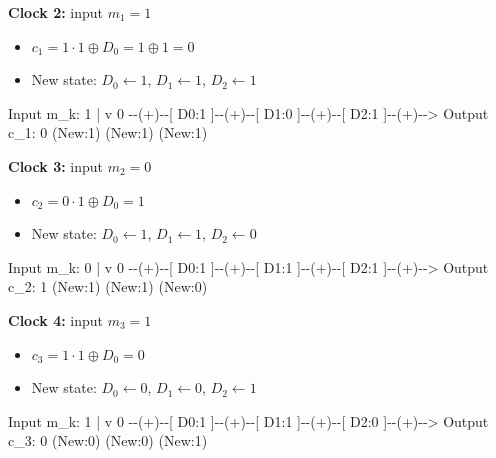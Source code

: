 \documentclass[
]{article}
\newenvironment{Shaded}{}{}
\newcommand{\NormalTok}[1]{#1}
\providecommand{\tightlist}{%
  \setlength{\itemsep}{0pt}\setlength{\parskip}{0pt}}
\begin{document}
\textbf{Clock 2:} input \(m_1=1\)

\begin{itemize}
\tightlist
\item
  \(c_1 = 1 \cdot 1 \oplus D_0 = 1 \oplus 1 = 0\)
\item
  New state: \(D_0 \leftarrow 1\), \(D_1 \leftarrow 1\),
  \(D_2 \leftarrow 1\)
\end{itemize}

\begin{Shaded}
\begin{Highlighting}[]
\NormalTok{Input m\_k: 1}
\NormalTok{     |}
\NormalTok{     v}
\NormalTok{0 {-}{-}(+){-}{-}[ D0:1 ]{-}{-}(+){-}{-}[ D1:0 ]{-}{-}(+){-}{-}[ D2:1 ]{-}{-}(+){-}{-}\textgreater{} Output c\_1: 0}
\NormalTok{         (New:1)        (New:1)        (New:1)}
\end{Highlighting}
\end{Shaded}

\textbf{Clock 3:} input \(m_2=0\)

\begin{itemize}
\tightlist
\item
  \(c_2 = 0 \cdot 1 \oplus D_0 = 1\)
\item
  New state: \(D_0 \leftarrow 1\), \(D_1 \leftarrow 1\),
  \(D_2 \leftarrow 0\)
\end{itemize}

\begin{Shaded}
\begin{Highlighting}[]
\NormalTok{Input m\_k: 0}
\NormalTok{     |}
\NormalTok{     v}
\NormalTok{0 {-}{-}(+){-}{-}[ D0:1 ]{-}{-}(+){-}{-}[ D1:1 ]{-}{-}(+){-}{-}[ D2:1 ]{-}{-}(+){-}{-}\textgreater{} Output c\_2: 1}
\NormalTok{         (New:1)        (New:1)        (New:0)}
\end{Highlighting}
\end{Shaded}

\textbf{Clock 4:} input \(m_3=1\)

\begin{itemize}
\tightlist
\item
  \(c_3 = 1 \cdot 1 \oplus D_0 = 0\)
\item
  New state: \(D_0 \leftarrow 0\), \(D_1 \leftarrow 0\),
  \(D_2 \leftarrow 1\)
\end{itemize}

\begin{Shaded}
\begin{Highlighting}[]
\NormalTok{Input m\_k: 1}
\NormalTok{     |}
\NormalTok{     v}
\NormalTok{0 {-}{-}(+){-}{-}[ D0:1 ]{-}{-}(+){-}{-}[ D1:1 ]{-}{-}(+){-}{-}[ D2:0 ]{-}{-}(+){-}{-}\textgreater{} Output c\_3: 0}
\NormalTok{         (New:0)        (New:0)        (New:1)}
\end{Highlighting}
\end{Shaded}
\end{document}
